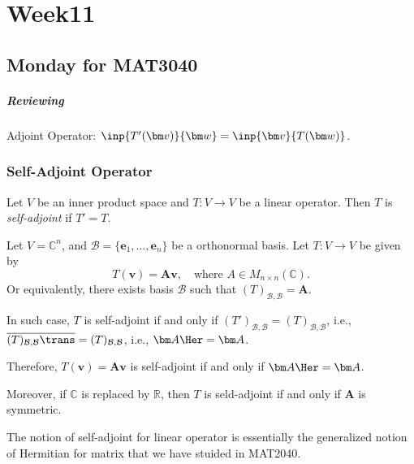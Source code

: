 \chapter{Week11}
\section{Monday for MAT3040}
\paragraph{Reviewing}
Adjoint Operator: $\inp{T'(\bm v)}{\bm w}=\inp{\bm v}{T(\bm w)}$.

\subsection{Self-Adjoint Operator}
\begin{definition}
Let $V$ be an inner product space and $T:V\to V$ be a linear operator.
Then $T$ is \emph{self-adjoint} if $T'=T$.
\end{definition}

\begin{example}
Let $V=\mathbb{C}^n$, and $\mathcal{B}=\{\bm e_1,\dots,\bm e_n\}$ be a orthonormal basis.
Let $T:V\to V$ be given by
\[
T(\bm v)=\bm A\bm v,\quad
\text{where $A\in M_{n\times n}(\mathbb{C})$.}
\]
Or equivalently, there exists basis $\mathcal{B}$ such that $(T)_{\mathcal{B},\mathcal{B}}=\bm A$.

In such case, $T$ is self-adjoint if and only if 
$(T')_{\mathcal{B},\mathcal{B}}=(T)_{\mathcal{B},\mathcal{B}}$, i.e.,
$\overline{(T)_{\mathcal{B},\mathcal{B}}\trans}=(T)_{\mathcal{B},\mathcal{B}}$, i.e.,
$\bm A\Her=\bm A$.

Therefore, $T(\bm v)=\bm A\bm v$ is self-adjoint if and only if $\bm A\Her=\bm A$.

Moreover, if $\mathbb{C}$ is replaced by $\mathbb{R}$, then $T$ is seld-adjoint if and only if $\bm A$ is symmetric.
\end{example}
\begin{remark}
The notion of self-adjoint for linear operator is essentially the generalized notion of Hermitian for matrix that we have stuided in MAT2040.
\end{remark}


